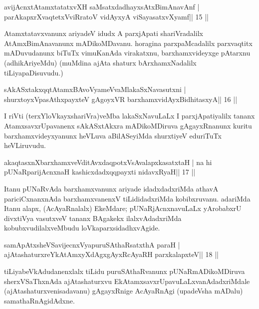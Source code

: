 \begin{shl}
avijAcnxtAtamxtatatxvXH saMsatxdadhayxsAtxBimAnavAnf |
parAkapxrXvaqtetxVviRratoV vidAyxyA viSayasatxvXyamf\hfill || 15 ||
\end{shl}

\begin{artha}
Atamxtatavxvanunx ariyadeV idudx A parxjApati shariVradalilx 
AtAmxBimAnavanunx mADikoMDavanu. horagina parxpaMcadalilx parxvaqtitx 
mADuvudanunx biTuTx vimuKanAda virakatxnu, barxhamxvideyxge pAtarxnu 
(adhikAriyeMdu) (muMdina ajAta shaturx bArxhamxNadalilx 
tiLiyapaDisuvudu.)
\end{artha}

\begin{shl}
sAkASxtakxqqtAtamxBAvoV\s yameVvaMlakaSxNavasutxni |
shurxtoyxVpasAthxpayxteV gAgoyxVR barxhamxvidAyxBidhitasxyA\hfill || 16 ||
\end{shl}

\begin{artha}
I riVti (terxYloVkayxshariVra)veMba lakaSxNavuLaLx I parxjApatiyalilx 
tananx AtamxsavxrUpavanenx sAkASxtAkxra mADikoMDiruva gAgayxRnanunx kuritu barxhamxvideyxyanunx heVLuva aBilASeyiMda shurxtiyeV eduriTuTx heVLiruvudu.
\end{artha} 
 

\begin{shl}
akaqtasxnXbarxhamxveVditAvxdaqpotxV\s sAvalapxkasatxtaH |
na hi pUNaRparijAcnxnaH kashicxdadxqqpayxti nidavxRyaH\hfill || 17 ||
\end{shl}

\begin{artha}
Itanu pUNaRvAda barxhamxvanunx ariyade idadxdadxriMda athavA pariciCxnanxnAda barxhamxvanenxV tiLididadxriMda kobibxruvanu. adariMda Itanu alapx, (AcAyaRnalalx) EkeMdare; pUNaRjAcnxnavuLaLx yArobabxrU divxtiVya vasutxveV tananx BAgakekx ilalxvAdadxriMda kobubxvudilalxveMbudu loVkaparxsidadhxvAgide.
\end{artha}

\begin{shl}
samApAtxsheVSavijecnxVyapuruSAthaRsatxthA paraH |
ajAtashaturxreYkAtAmxyXdAgxgAyxRcAyaRH parxkalapxteV\hfill || 18 ||
\end{shl}

\begin{artha}
tiLiyabeVkAdudanenxlalx tiLidu puruSAthaRvanunx pUNaRmADikoMDiruva sherxVSaThxnAda ajAtashaturxvu EkAtamxsavxrUpavuLaLxvanAdadxriMdale (ajAtashaturxvenisadavanu) gAgayxRnige AcAyaRnAgi (upadeVsha mADalu) samathaRnAgidAdxne.
\end{artha}

